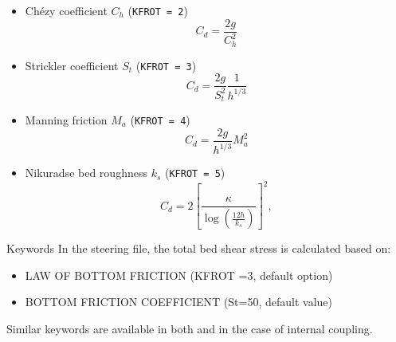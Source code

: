 \begin{itemize}
\item  Ch\'{e}zy coefficient $C_h$ (\texttt{KFROT = 2})
\begin{equation}\label{eq:chezy}
C_d = \frac{2g}{C_h^2} 
\end{equation}
\item  Strickler coefficient $S_t$ (\texttt{KFROT = 3})
\begin{equation}\label{eq:strickler}
C_d = \frac{2g}{S_t^2}\frac{1}{h^{1/3}} 
\end{equation}
\item  Manning friction $M_a$ (\texttt{KFROT = 4})
\begin{equation}\label{eq:manning}
C_d =\frac{2g}{h^{1/3} } M_a^2 
\end{equation}
\item  Nikuradse bed roughness $k_s$ (\texttt{KFROT = 5})
\begin{equation}\label{eq:nikuradse}
C_d  = 2\left[\frac{\kappa}{\log(\frac{12h}{k_s})}\right]^2,  
\end{equation}

\end{itemize}

\medskip
\begin{bclogo}[couleur=blue!10,arrondi=0.1, logo=\bcinfo]{Keywords}
In the \sisyphe steering file, the total bed shear stress is calculated based
on:
\begin{itemize}
\item {\ttfamily LAW OF BOTTOM FRICTION} ({\ttfamily KFROT =3}, default option)
\item {\ttfamily BOTTOM FRICTION COEFFICIENT} ({\ttfamily St=50}, default value)
\end{itemize}
\end{bclogo}

Similar keywords are available in both \teldd and \telddd in the case of
internal coupling.


